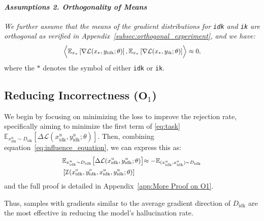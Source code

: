 \paragraph{\textit{Assumptions 2. Orthogonality of Means}}
\textit{We further assume that the means of the gradient distributions for \texttt{idk} and \texttt{ik} are orthogonal as verified in Appendix~\ref{subsec:orthogonal_experiment}, and we have:}
\begin{equation}
\small
\label{eq:loss_decomposition}
\begin{aligned}
\Bigl \langle \mathbb{E}_{x_{*} } \left[ \nabla \mathcal{L}(x_{*},y_{\text{idk}}; \theta) \right],
\mathbb{E}_{x_{*} } \left[ \nabla \mathcal{L}(x_{*},y_{\text{ik}}; \theta) \right]
\Bigr \rangle \approx 0,
\end{aligned}
\end{equation}
where the \( * \) denotes the symbol of either \texttt{idk} or \texttt{ik}.

\subsection{Reducing Incorrectness ($\mathbf{O}_1$)}
\label{sec:Reducing Incorrectness}
We begin by focusing on minimizing the loss to improve the rejection rate, specifically aiming to minimize the first term of \eqref{eq:task} $\mathbb{E}_{x^{u}_{\text{idk}} \sim D_{\text{idk}}} \left[ \Delta \mathcal{L}(x^{u}_{\text{idk}}, y^{u}_{\text{idk}}; \theta) \right]$. Then, combining equation~\eqref{eq:influence_equation}, we can express this as:
\begin{equation}
\small
\label{eq:loss_decomposition_short}
\begin{aligned}
&\mathbb{E}_{x^{u}_{\text{idk}} \sim D_{\text{idk}}} \bigl[ \Delta \mathcal{L}(x^{u}_{\text{idk}}, y^{u}_{\text{idk}}; \theta) \bigl]  
\approx 
- \mathbb{E} _{(x^{u} _{\text{idk}}, x^o _{\text{idk}}) \sim D _{\text{idk}}} \\  &\left[ \mathcal{I}(x^{o} _{\text{idk}}, y^{o} _{\text{idk}}, x^{u} _{\text{idk}}, y^{u} _{\text{idk}}; \theta) \right]
\end{aligned} \noindent
\end{equation}
and the full proof is detailed in Appendix~\ref{app:More Proof on O1}.

Thus, samples with gradients similar to the average gradient direction of $D_{\text{idk}}$ are the most effective in reducing the model's hallucination rate.

